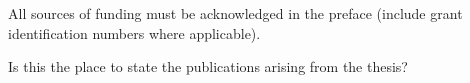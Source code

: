 
\begin{preface}

All sources of funding must be acknowledged in the preface (include grant identification numbers where applicable).

Is this the place to state the publications arising from the thesis?

\end{preface}

